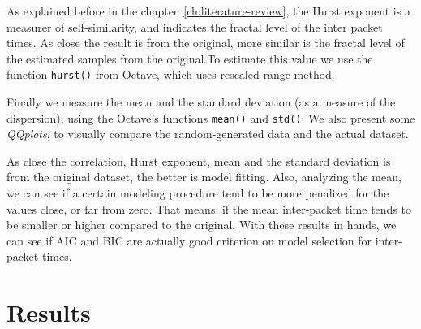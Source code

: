 As explained before in the chapter~\ref{ch:literature-review}, the Hurst exponent is a measurer of self-similarity, and indicates the fractal level of the inter packet times. As close the result is from the original, more similar is the fractal level of the estimated samples from the original.To estimate this value we use the function \texttt{hurst()} from Octave, which uses rescaled range method.

Finally we measure the mean and the standard deviation (as a measure of the dispersion), using the Octave's functions \texttt{mean()} and \texttt{std()}. We also present some \textit{QQplots}, to visually compare the random-generated data and the actual dataset. 


As close the correlation, Hurst exponent, mean and the standard deviation is from the original dataset, the better is model fitting. Also, analyzing the mean, we can see if a certain modeling procedure tend to be more penalized for the values close, or far from zero. That means, if the mean inter-packet time tends to be smaller or higher compared to the original. With these results in hands, we can see if AIC and BIC are actually good criterion on model selection for inter-packet times.

\section{Results}

